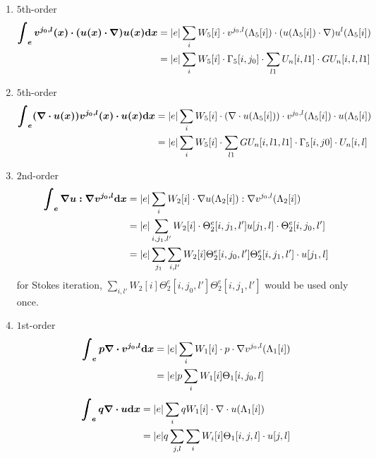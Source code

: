 \begin{enumerate}
  \item $5$th-order
    \begin{equation}
      \begin{split}
        \bm{\int_e v^{j_0,l}(x)\cdot(u(x)\cdot\nabla)u(x)\mathrm{d} x}
        &= |e|\sum_i W_5[i]\cdot v^{j_0,l}(\Lambda_5[i]) \cdot 
        (u(\Lambda_5[i])\cdot\nabla)u^l(\Lambda_5[i]) \\
        &= |e|\sum_{i} W_5[i]\cdot \Gamma_5[i,j_0] 
        \cdot \sum_{l1} U_n[i,l1] \cdot GU_n[i,l,l1]
      \end{split}
    \end{equation}

  \item $5$th-order
    \begin{equation}
      \begin{split}
        \bm{\int_e(\nabla\cdot u(x))v^{j_0,l}(x)\cdot u(x)\mathrm{d} x}
        &= |e|\sum_i W_5[i] \cdot (\nabla\cdot u(\Lambda_5[i]))\cdot 
        v^{j_0,l}(\Lambda_5[i]) \cdot u(\Lambda_5[i]) \\
        &= |e|\sum_i W_5[i] \cdot \sum_{l1} GU_n[i,l1,l1] 
        \cdot \Gamma_5[i,j0] \cdot U_n[i,l]
      \end{split}
    \end{equation}

  \item $2$nd-order
    \begin{equation}\label{eq:integral-gugv}
      \begin{split}
        \bm{\int_e \nabla u:\nabla v^{j_0,l}\mathrm{d} x} &= |e| \sum_i W_2[i]\cdot 
        \nabla u(\Lambda_2[i]) : \nabla v^{j_0,l}(\Lambda_2[i]) \\
        &= |e| \sum_{i,j_1,l'} W_2[i]\cdot 
        \Theta_2^e[i,j_1,l']u[j_1,l] \cdot \Theta_2^e[i,j_0,l'] \\
        &= |e| \sum_{j_1} \sum_{i,l'}W_2[i]\Theta_2^e[i,j_0,l']\Theta_2^e[i,j_1,l'] 
        \cdot u[j_1,l]
      \end{split}
    \end{equation}
    for Stokes iteration, $\sum_{i,l'}W_2[i]\Theta_2^e[i,j_0,l']\Theta_2^e[i,j_1,l']$
    would be used only once.

  \item $1$st-order
    \begin{equation}\label{eq:integral-pgv}
      \begin{split}
        \bm{\int_e p\nabla\cdot v^{j_0,l}\mathrm{d} x} &= |e| \sum_i W_1[i]\cdot p\cdot 
        \nabla v^{j_0,l}(\Lambda_1[i]) \\
        &= |e| p\sum_i W_1[i] \Theta_1[i,j_0,l]
      \end{split}
    \end{equation}
    \begin{equation}\label{eq:integral-qgu}
      \begin{split}
        \bm{\int_e q\nabla\cdot u\mathrm{d} x} &= |e| \sum_i qW_1[i]\cdot 
        \nabla \cdot u(\Lambda_1[i]) \\
        &= |e|q \sum_{j,l}\sum_{i} W_i[i]\Theta_1[i,j,l]\cdot u[j,l]
      \end{split}
    \end{equation}


\end{enumerate}
